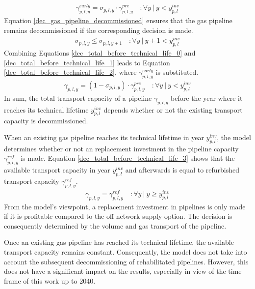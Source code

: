 \begin{align}\label{dec_total_before_technical_life_1}
	\gamma^{early}_{p,l, y} = \sigma_{p,l,y} \cdot \gamma^{pre}_{p,l,y} \quad:\forall y~|~y<y^{inv}_{p,l}
\end{align}
Equation \ref{dec_gas_pipeline_decommissioned} ensures that the gas pipeline remains decommissioned if the corresponding decision is made.
\begin{align}\label{dec_gas_pipeline_decommissioned}
	\sigma_{p,l,y} \leq \sigma_{p,l,y+1} \quad:\forall y~|~y+1<y^{inv}_{p,l}
\end{align}
Combining Equations \ref{dec_total_before_technical_life_0} and \ref{dec_total_before_technical_life_1} leads to Equation \ref{dec_total_before_technical_life_2}, where $\gamma^{early}_{p,l, y}$ is substituted. 
\begin{align}\label{dec_total_before_technical_life_2}
	\gamma_{p,l, y} = (1-\sigma_{p,l,y}) \cdot \gamma^{pre}_{p,l, y} \quad:\forall y~|~y<y^{inv}_{p,l}
\end{align}
In sum, the total transport capacity of a pipeline $\gamma_{p,l, y}$ before the year where it reaches its technical lifetime $y^{inv}_{p,l}$ depends whether or not the existing transport capacity is decommissioned.\vspace{0.3cm}

When an existing gas pipeline reaches its technical lifetime in year $y^{inv}_{p,l}$, the model determines whether or not an replacement investment in the pipeline capacity $\gamma^{ref}_{p,l, y}$ is made. Equation \ref{dec_total_before_technical_life_3} shows that the available transport capacity in year $y^{inv}_{p,l}$ and afterwards is equal to refurbished transport capacity $\gamma^{ref}_{p,l, y}$. 
\begin{align}\label{dec_total_before_technical_life_3}
	\gamma_{p,l, y} = \gamma^{ref}_{p,l, y} \quad:\forall y~|~y \geq y^{inv}_{p,l}
\end{align}
From the model's viewpoint, a replacement investment in pipelines is only made if it is profitable compared to the off-network supply option. The decision is consequently determined by the volume and gas transport of the pipeline.\vspace{0.3cm}

Once an existing gas pipeline has reached its technical lifetime, the available transport capacity remains constant. Consequently, the model does not take into account the subsequent decommissioning of rehabilitated pipelines. However, this does not have a significant impact on the results, especially in view of the time frame of this work up to 2040.

